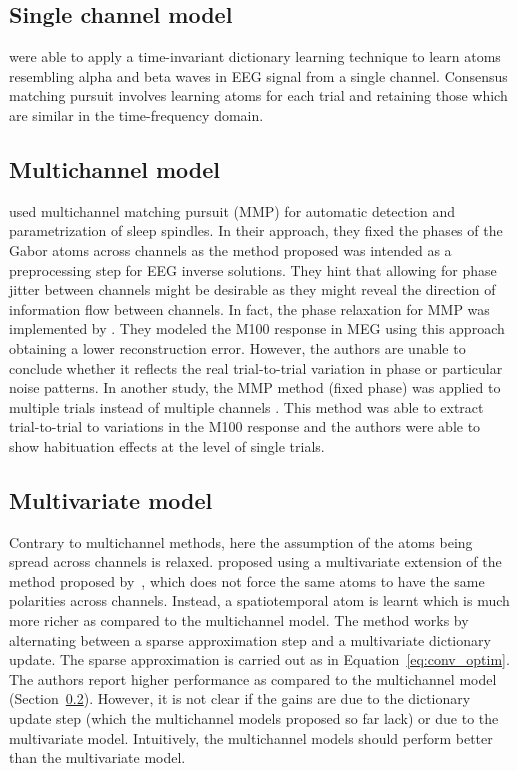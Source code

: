 \subsection{Single channel model}

\citet{jost2006motif} were able to apply a time-invariant dictionary learning technique to learn atoms resembling alpha and beta waves in EEG signal from a single channel. Consensus matching pursuit \citep{benar2009consensus} involves learning atoms for each trial and retaining those which are similar in the time-frequency domain.

\subsection{Multichannel model}
\label{sec:multichannel}
\citet{durka2005multichannel} used multichannel matching pursuit (MMP) for automatic detection and parametrization of sleep spindles. In their approach, they fixed the phases of the Gabor atoms across channels as the method proposed was intended as a preprocessing step for EEG inverse solutions. They hint that allowing for phase jitter between channels might be desirable as they might reveal the direction of information flow between channels. In fact, the phase relaxation for MMP was implemented by \citet{sieluzyckiamultivariate}. They modeled the M100 response in MEG using this approach obtaining a lower reconstruction error. However, the authors are unable to conclude whether it reflects the real trial-to-trial variation in phase or particular noise patterns. In another study, the MMP method (fixed phase) was applied to multiple trials instead of multiple channels \citep{sieluzycki2009single}. This method was able to extract trial-to-trial to variations in the M100 response and the authors were able to show habituation effects at the level of single trials.

\subsection{Multivariate model}
Contrary to multichannel methods, here the assumption of the atoms being spread across channels is relaxed. \citet{barthelemy2013multivariate} proposed using a multivariate extension of the method proposed by~\cite{durka2005multichannel}, which does not force the same atoms to have the same polarities across channels. Instead, a spatiotemporal atom is learnt which is much more richer as compared to the multichannel model. The method works by alternating between a sparse approximation step and a multivariate dictionary update. The sparse approximation is carried out as in Equation~\ref{eq:conv_optim}. The authors report higher performance as compared to the multichannel model (Section~\ref{sec:multichannel}). However, it is not clear if the gains are due to the dictionary update step (which the multichannel models proposed so far lack) or due to the multivariate model. Intuitively, the multichannel models should perform better than the multivariate model.


